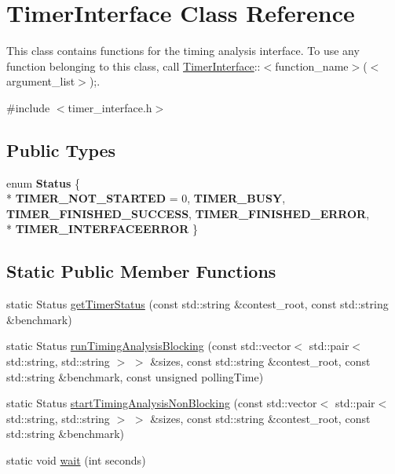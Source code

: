 \hypertarget{classTimerInterface}{\section{Timer\-Interface Class Reference}
\label{classTimerInterface}
}


This class contains functions for the timing analysis interface. To use any function belonging to this class, call \hyperlink{classTimerInterface}{Timer\-Interface}\-:\-:$<$function\-\_\-name$>$($<$argument\-\_\-list$>$);.  




{\ttfamily \#include $<$timer\-\_\-interface.\-h$>$}

\subsection*{Public Types}
\begin{DoxyCompactItemize}
\item 
enum {\bfseries Status} \{ \\*
{\bfseries T\-I\-M\-E\-R\-\_\-\-N\-O\-T\-\_\-\-S\-T\-A\-R\-T\-E\-D} = 0, 
{\bfseries T\-I\-M\-E\-R\-\_\-\-B\-U\-S\-Y}, 
{\bfseries T\-I\-M\-E\-R\-\_\-\-F\-I\-N\-I\-S\-H\-E\-D\-\_\-\-S\-U\-C\-C\-E\-S\-S}, 
{\bfseries T\-I\-M\-E\-R\-\_\-\-F\-I\-N\-I\-S\-H\-E\-D\-\_\-\-E\-R\-R\-O\-R}, 
\\*
{\bfseries T\-I\-M\-E\-R\-\_\-\-I\-N\-T\-E\-R\-F\-A\-C\-E\-E\-R\-R\-O\-R}
 \}
\end{DoxyCompactItemize}
\subsection*{Static Public Member Functions}
\begin{DoxyCompactItemize}
\item 
static Status \hyperlink{classTimerInterface_a42077a21e0b9a07b6768e5131415bd2d}{get\-Timer\-Status} (const std\-::string \&contest\-\_\-root, const std\-::string \&benchmark)
\item 
static Status \hyperlink{classTimerInterface_ada94a843a56747a6a7b34373a266ab92}{run\-Timing\-Analysis\-Blocking} (const std\-::vector$<$ std\-::pair$<$ std\-::string, std\-::string $>$ $>$ \&sizes, const std\-::string \&contest\-\_\-root, const std\-::string \&benchmark, const unsigned polling\-Time)
\item 
static Status \hyperlink{classTimerInterface_a9a9b69817bbbd603c3d47089b0bad829}{start\-Timing\-Analysis\-Non\-Blocking} (const std\-::vector$<$ std\-::pair$<$ std\-::string, std\-::string $>$ $>$ \&sizes, const std\-::string \&contest\-\_\-root, const std\-::string \&benchmark)
\item 
static void \hyperlink{classTimerInterface_aa62e01d4dd296f8bf9f716ff2da7c5fc}{wait} (int seconds)
\end{DoxyCompactItemize}



